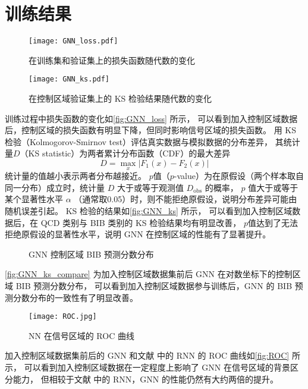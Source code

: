 \section{训练结果}
\begin{figure}[ht]
    \centering
    \texttt{[image: GNN\_loss.pdf]}
    \caption{在训练集和验证集上的损失函数随代数的变化}
    \label{fig:GNN_loss}
\end{figure}

\begin{figure}[ht]
    \centering
    \texttt{[image: GNN\_ks.pdf]}
    \caption{在控制区域验证集上的 KS 检验结果随代数的变化}
    \label{fig:GNN_ks}
\end{figure}

训练过程中损失函数的变化如\autoref{fig:GNN_loss} 所示，
可以看到加入控制区域数据后，控制区域的损失函数有明显下降，但同时影响信号区域的损失函数。
用 KS 检验（Kolmogorov-Smirnov test）评估真实数据与模拟数据的分布差异，
其统计量$D$（KS statistic）为两者累计分布函数（CDF）的最大差异
\begin{equation}
    D = \max\limits_{x} |F_1(x) - F_2(x)|
\end{equation}
统计量的值越小表示两者分布越接近。
$p$值（$p$-value）为在原假设（两个样本取自同一分布）成立时，统计量 $D$ 大于或等于观测值 $D_{\text{obs}}$ 的概率，
$p$ 值大于或等于某个显著性水平 $\alpha$ （通常取0.05）时，则不能拒绝原假设，说明分布差异可能由随机误差引起。
KS 检验的结果如\autoref{fig:GNN_ks} 所示，
可以看到加入控制区域数据后，在 QCD 类别与 BIB 类别的 KS 检验结果均有明显改善，
$p$值达到了无法拒绝原假设的显著性水平，说明 GNN 在控制区域的性能有了显著提升。

\begin{figure}[ht]
    \centering
    \hfill
    \caption{GNN 控制区域 BIB 预测分数分布}
    \label{fig:GNN_ks_compare}
\end{figure}

\autoref{fig:GNN_ks_compare} 为加入控制区域数据集前后 GNN 在对数坐标下的控制区域 BIB 预测分数分布，
可以看到加入控制区域数据参与训练后，GNN 的 BIB 预测分数分布的一致性有了明显改善。

\begin{figure}[ht]
    \centering
    \texttt{[image: ROC.jpg]}
    \caption{NN 在信号区域的 ROC 曲线}
    \label{fig:ROC}
\end{figure}

加入控制区域数据集前后的 GNN 和文献\cite{ATLAS:2022zhj} 中的 RNN 的 ROC 曲线如\autoref{fig:ROC} 所示，
可以看到加入控制区域数据在一定程度上影响了 GNN 在信号区域的背景区分能力，
但相较于文献\cite{ATLAS:2022zhj} 中的 RNN，GNN 的性能仍然有大约两倍的提升。
